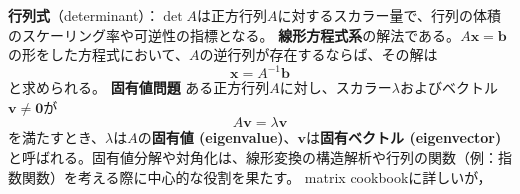 \textbf{行列式}（determinant）：$\det A$は正方行列$A$に対するスカラー量で、行列の体積のスケーリング率や可逆性の指標となる。
\textbf{線形方程式系}の解法である。$A\mathbf{x} = \mathbf{b}$の形をした方程式において、$A$の逆行列が存在するならば、その解は
\begin{equation}
\mathbf{x} = A^{-1}\mathbf{b}
\end{equation}
と求められる。
\textbf{固有値問題}
ある正方行列$A$に対し、スカラー$\lambda$およびベクトル$\mathbf{v} \ne \mathbf{0}$が
\begin{equation}
A\mathbf{v} = \lambda \mathbf{v}
\end{equation}
を満たすとき、$\lambda$は$A$の\textbf{固有値 (eigenvalue)}、$\mathbf{v}$は\textbf{固有ベクトル (eigenvector)} と呼ばれる。固有値分解や対角化は、線形変換の構造解析や行列の関数（例：指数関数）を考える際に中心的な役割を果たす。
matrix cookbookに詳しいが，
